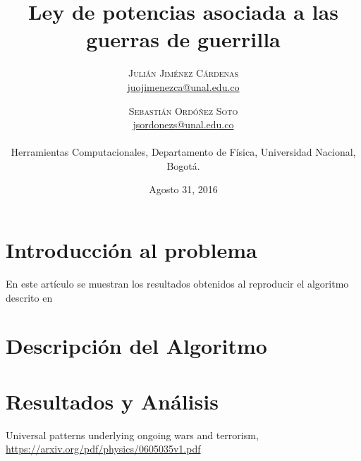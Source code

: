 \documentclass[twoside,twocolumn]{article}
\title{Ley de potencias asociada a las guerras de guerrilla} %
\author{%
\textsc{Julián Jiménez Cárdenas} \\[1ex] %
\normalsize \href{mailto:juojimenezca@unal.edu.co}{juojimenezca@unal.edu.co} %
\and %
\textsc{Sebastián Ordóñez Soto} \\[1ex]
\normalsize \href{mailto:jsordonezs@unal.edu.co}{jsordonezs@unal.edu.co} 
\\ \\ \normalsize{Herramientas Computacionales, Departamento de Física, Universidad Nacional, Bogotá.} %
}
\date{\normalsize{Agosto 31, 2016}} %
\begin{document}
\maketitle

\section{Introducción al problema}
En este artículo se muestran los resultados obtenidos al reproducir el algoritmo descrito en 


\section{Descripción del Algoritmo}


\section{Resultados y Análisis}


\begin{thebibliography}{99} %

Universal patterns underlying ongoing wars and terrorism, \url{https://arxiv.org/pdf/physics/0605035v1.pdf}

\end{thebibliography}


\end{document}
